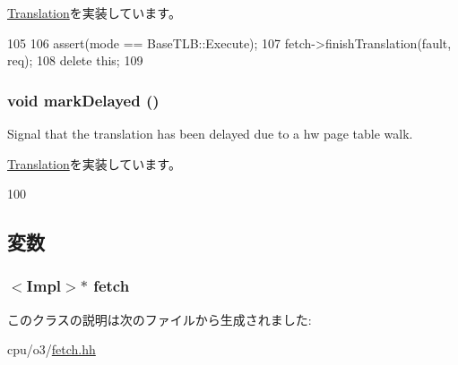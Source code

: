\hyperlink{classBaseTLB_1_1Translation_a5698e0a932f298729d10355d4384e565}{Translation}を実装しています。


\begin{DoxyCode}
105         {
106             assert(mode == BaseTLB::Execute);
107             fetch->finishTranslation(fault, req);
108             delete this;
109         }
\end{DoxyCode}
\hypertarget{classDefaultFetch_1_1FetchTranslation_ad1fd11d1e352cfc4b329d29b46a19fc4}{
\subsubsection[{markDelayed}]{\setlength{\rightskip}{0pt plus 5cm}void markDelayed ()}}
\label{classDefaultFetch_1_1FetchTranslation_ad1fd11d1e352cfc4b329d29b46a19fc4}
Signal that the translation has been delayed due to a hw page table walk. 

\hyperlink{classBaseTLB_1_1Translation_ab88d5e1938190b55d7859d5cc4d10446}{Translation}を実装しています。


\begin{DoxyCode}
100         {}
\end{DoxyCode}


\subsection{変数}
\hypertarget{classDefaultFetch_1_1FetchTranslation_a10f1a41fdcff6e7574a83b020d3c1a91}{
\subsubsection[{fetch}]{$<$Impl$>$$\ast$ {\bf fetch}}}
\label{classDefaultFetch_1_1FetchTranslation_a10f1a41fdcff6e7574a83b020d3c1a91}


このクラスの説明は次のファイルから生成されました:\begin{DoxyCompactItemize}
\item 
cpu/o3/\hyperlink{fetch_8hh}{fetch.hh}\end{DoxyCompactItemize}
